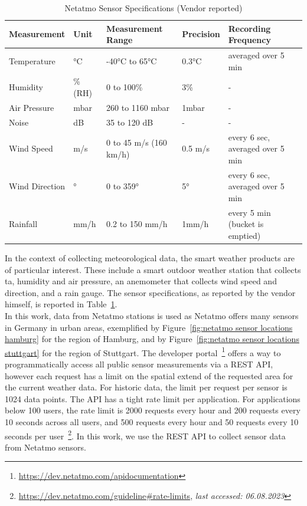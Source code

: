 \begin{table}[]
\begin{tabular}{@{}lllll@{}}
\toprule
Measurement    & Unit    & Measurement Range      & Precision  & Recording Frequency              \\ \midrule
Temperature    & °C      & -40°C to 65°C          & 0.3°C   & averaged over 5 min              \\
Humidity       & \% (RH) & 0 to 100\%             & 3\%     & -                                \\
Air Pressure   & mbar    & 260 to 1160 mbar       & 1mbar   & -                                \\
Noise          & dB      & 35 to 120 dB           & -       & -                                \\
Wind Speed     & m/s     & 0 to 45 m/s (160 km/h) & 0.5 m/s & every 6 sec, averaged over 5 min \\
Wind Direction & °       & 0 to 359°              & 5°      & every 6 sec, averaged over 5 min \\
Rainfall       & mm/h    & 0.2 to 150 mm/h        & 1mm/h   & every 5 min (bucket is emptied)  \\ \bottomrule
\end{tabular}
\caption{Netatmo Sensor Specifications (Vendor reported)}
\label{tab: netatmo sensor specs}
\end{table}

In the context of collecting meteorological data, the smart weather products are of particular interest. These include a smart outdoor weather station that collects \gls{ta}, humidity and air pressure, an anemometer that collects wind speed and direction, and a rain gauge. The sensor specifications, as reported by the vendor himself, is reported in Table~\ref{tab: netatmo sensor specs}.\\
In this work, data from Netatmo stations is used as Netatmo offers many sensors in Germany in urban areas, exemplified by Figure~\ref{fig:netatmo sensor locations hamburg} for the region of Hamburg, and by Figure~\ref{fig:netatmo sensor locations stuttgart} for the region of Stuttgart.
The developer portal~\footnote{\url{https://dev.netatmo.com/apidocumentation}} offers a way to programmatically access all public sensor measurements via a REST API, however each request has a limit on the spatial extend of the requested area for the current weather data. For historic data, the limit per request per sensor is 1024 data points. The API has a tight rate limit per application. For applications below 100 users, the rate limit is 2000 requests every hour and 200 requests every 10 seconds across all users, and 500 requests every hour and 50 requests every 10 seconds per user~\footnote{\url{https://dev.netatmo.com/guideline\#rate-limits}, \textit{last accessed: 06.08.2023}}. In this work, we use the REST API to collect sensor data from Netatmo sensors.

